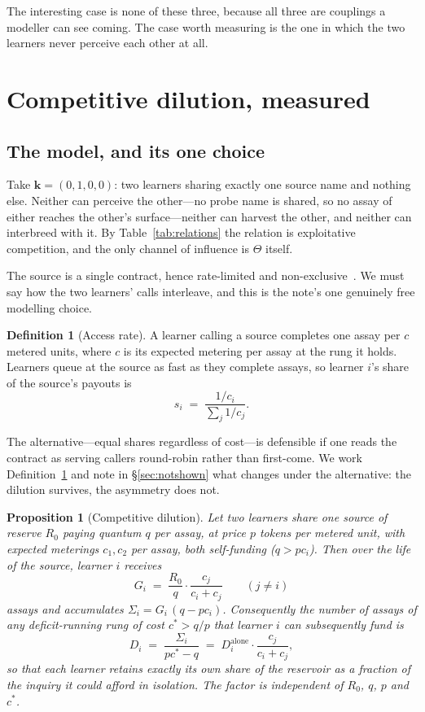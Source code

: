 \documentclass[11pt,a4paper]{article}
\theoremstyle{plain}
\newtheorem{proposition}[theorem]{Proposition}
\theoremstyle{definition}
\newtheorem{definition}[theorem]{Definition}
\theoremstyle{remark}
\begin{document}
The interesting case is none of these three, because all three are couplings a modeller can see
coming. The case worth measuring is the one in which the two learners never perceive each other
at all.

\section{Competitive dilution, measured}\label{sec:dilution}

\subsection{The model, and its one choice}

Take $\mathbf{k} = (0,1,0,0)$: two learners sharing exactly one source name and nothing else.
Neither can perceive the other---no probe name is shared, so no assay of either reaches the
other's surface---neither can harvest the other, and neither can interbreed with it. By
Table~\ref{tab:relations} the relation is exploitative competition, and the only channel of
influence is $\Theta$ itself.

The source is a single contract, hence rate-limited and non-exclusive~\cite[Def.~39]{scientist}.
We must say how the two learners' calls interleave, and this is the note's one genuinely free
modelling choice.

\begin{definition}[Access rate]\label{def:rate}
A learner calling a source completes one assay per $c$ metered units, where $c$ is its expected
metering per assay at the rung it holds. Learners queue at the source as fast as they complete
assays, so learner $i$'s share of the source's payouts is
\[
  s_i \;=\; \frac{1/c_i}{\sum_j 1/c_j}.
\]
\end{definition}

The alternative---equal shares regardless of cost---is defensible if one reads the contract as
serving callers round-robin rather than first-come. We work Definition~\ref{def:rate} and note in
\S\ref{sec:notshown} what changes under the alternative: the dilution survives, the asymmetry
does not.

\begin{proposition}[Competitive dilution]\label{prop:dilution}
Let two learners share one source of reserve $R_0$ paying quantum $q$ per assay, at price $p$
tokens per metered unit, with expected meterings $c_1, c_2$ per assay, both self-funding
($q > p c_i$). Then over the life of the source, learner $i$ receives
\[
  G_i \;=\; \frac{R_0}{q}\cdot \frac{c_{j}}{c_i + c_{j}} \qquad (j \neq i)
\]
assays and accumulates $\Sigma_i = G_i\,(q - p c_i)$. Consequently the number of assays of any
deficit-running rung of cost $c^\ast > q/p$ that learner $i$ can subsequently fund is
\[
  D_i \;=\; \frac{\Sigma_i}{p c^\ast - q}
  \;=\; D_i^{\text{alone}} \cdot \frac{c_{j}}{c_i + c_{j}} ,
\]
so that \emph{each learner retains exactly its own share of the reservoir as a fraction of the
inquiry it could afford in isolation}. The factor is independent of $R_0$, $q$, $p$ and $c^\ast$.
\end{proposition}
\end{document}
